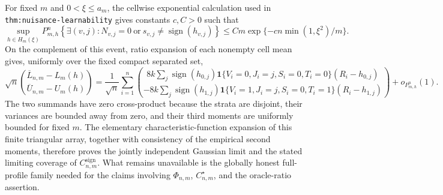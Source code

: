 For fixed \(m\) and \(0<\xi\le a_m\), the cellwise exponential calculation
used in \texttt{thm:nuisance-learnability} gives constants \(c,C>0\) such
that
\[
 \sup_{h\in H_m(\xi)}P_{m,h}^n
 \left\{\exists(v,j):N_{v,j}=0\ \text{or}\
 \widehat s_{v,j}\ne\operatorname{sign}(h_{v,j})\right\}
 \le Cm\exp\{-cn\min(1,\xi^2)/m\}.                                      \tag{40}
\]
On the complement of this event, ratio expansion of each nonempty cell mean
gives, uniformly over the fixed compact separated set,
\[
 \sqrt n\binom{\overline L_{n,m}-L_m(h)}
                    {\overline U_{n,m}-U_m(h)}
 =\frac1{\sqrt n}\sum_{i=1}^n
 \binom{8k\sum_j\operatorname{sign}(h_{0,j})
 \mathbf1\{V_i=0,J_i=j,S_i=0,T_i=0\}(R_i-h_{0,j})}
 {-8k\sum_j\operatorname{sign}(h_{1,j})
 \mathbf1\{V_i=1,J_i=j,S_i=0,T_i=1\}(R_i-h_{1,j})}
 +o_{P_{m,h}^n}(1).                                                       \tag{41}
\]
The two summands have zero cross-product because the strata are disjoint,
their variances are bounded away from zero, and their third moments are
uniformly bounded for fixed \(m\).  The elementary characteristic-function
expansion of this finite triangular array, together with consistency of the
empirical second moments, therefore proves the jointly independent Gaussian
limit and the stated limiting coverage of
\(C^{\mathrm{sign}}_{n,m}\).  What remains unavailable is the globally
honest full-profile family needed for the claims involving
\(\Phi_{n,m}\), \(C_{n,m}^{\star}\), and the oracle-ratio assertion.
